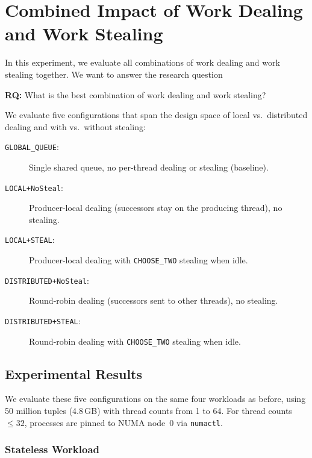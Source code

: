 \section{Combined Impact of Work Dealing and Work Stealing}
In this experiment, we evaluate all combinations of work dealing and work stealing together. We want to answer the research question

\begin{tcolorbox}[colback=blue!5, colframe=blue!40!black, title=Research Questions]
    \textbf{RQ:} What is the best combination of work dealing and work stealing?
\end{tcolorbox}

We evaluate five configurations that span the design space of local vs.\ distributed dealing and with vs.\ without stealing:
\begin{description}
    \item[\texttt{GLOBAL\_QUEUE}:] Single shared queue, no per-thread dealing or stealing (baseline).
    \item[\texttt{LOCAL+NoSteal}:] Producer-local dealing (successors stay on the producing thread), no stealing.
    \item[\texttt{LOCAL+STEAL}:] Producer-local dealing with \texttt{CHOOSE\_TWO} stealing when idle.
    \item[\texttt{DISTRIBUTED+NoSteal}:] Round-robin dealing (successors sent to other threads), no stealing.
    \item[\texttt{DISTRIBUTED+STEAL}:] Round-robin dealing with \texttt{CHOOSE\_TWO} stealing when idle.
\end{description}

\subsection{Experimental Results}
\label{sec:combined-results}

We evaluate these five configurations on the same four workloads as before, using 50 million tuples (4.8\,GB) with thread counts from 1 to 64.
For thread counts $\leq 32$, processes are pinned to NUMA node~0 via \texttt{numactl}.

\subsubsection{Stateless Workload}

